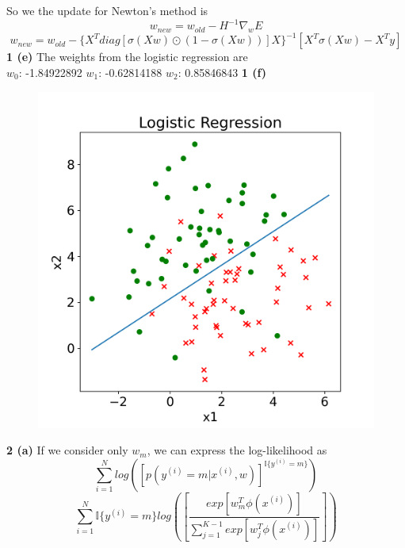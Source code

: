 \documentclass[12 pt]{article}        	%
\begin{document}
So we the update for Newton's method is
\[
  w_{new} = w_{old} - H^{-1} \nabla_w E 
\]
\[
  w_{new} = w_{old} - \{X^T diag[ \sigma(Xw) \odot (1 - \sigma(Xw)) ] X \}^{-1} [ X^T \sigma(Xw) - X^T y ]
\]
\textbf{1 (e)} The weights from the logistic regression are \\ 
$ w_0 $: -1.84922892 $ w_1 $: -0.62814188 $ w_2 $: 0.85846843
\newpage
\textbf{1 (f)}
\begin{figure}[h!]
  \includegraphics[width=\linewidth]{logistic_regression.png}
\end{figure}
\newpage
\textbf{2 (a)} If we consider only $ w_m $, we can express the log-likelihood as
\[
  \sum_{i=1}^{N} log([p(y^{(i)} = m | x^{(i)}, w)]^{\mathbb{I} \{ y^{(i)} = m \}})
\]
\[
  \sum_{i=1}^{N} \mathbb{I} \{ y^{(i)} = m \} log( [ \frac{
    exp[ w_{m}^{T} \phi(x^{(i)}) ]
  }{
    \sum_{j=1}^{K-1} exp[ w_{j}^{T} \phi(x^{(i)}) ]
  } ] )
\]
\end{document}
